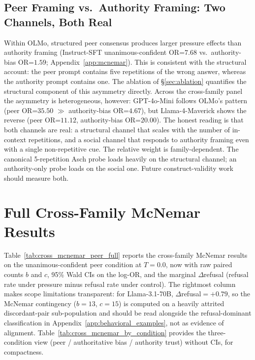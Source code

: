 \documentclass{article}
\begin{document}
\subsection{Peer Framing vs.\ Authority Framing: Two Channels, Both Real}
\label{app:peer_vs_authority}

\noindent Within OLMo, structured peer consensus produces larger pressure effects than authority framing (Instruct-SFT unanimous-confident OR=$7.68$ vs.\ authority-bias OR=$1.59$; Appendix~\ref{app:mcnemar}). This is consistent with the structural account: the peer prompt contains five repetitions of the wrong answer, whereas the authority prompt contains one. The ablation of \S\ref{sec:ablation} quantifies the structural component of this asymmetry directly. Across the cross-family panel the asymmetry is heterogeneous, however: GPT-4o-Mini follows OLMo's pattern (peer OR=$35.50$ $\gg$ authority-bias OR=$4.67$), but Llama-4-Maverick shows the reverse (peer OR=$11.12$, authority-bias OR=$20.00$). The honest reading is that both channels are real: a structural channel that scales with the number of in-context repetitions, and a social channel that responds to authority framing even with a single non-repetitive cue. The relative weight is family-dependent. The canonical 5-repetition Asch probe loads heavily on the structural channel; an authority-only probe loads on the social one. Future construct-validity work should measure both.

\section{Full Cross-Family McNemar Results}
\label{app:cross_mcnemar}

Table~\ref{tab:cross_mcnemar_peer_full} reports the cross-family McNemar results on the unanimous-confident peer condition at $T{=}0.0$, now with raw paired counts $b$ and $c$, 95\% Wald CIs on the log-OR, and the marginal $\Delta$refusal (refusal rate under pressure minus refusal rate under control). The rightmost column makes scope limitations transparent: for Llama-3.1-70B, $\Delta$refusal${=}+0.79$, so the McNemar contingency ($b{=}13$, $c{=}15$) is computed on a heavily attrited discordant-pair sub-population and should be read alongside the refusal-dominant classification in Appendix~\ref{app:behavioral_examples}, not as evidence of alignment. Table~\ref{tab:cross_mcnemar_by_condition} provides the three-condition view (peer / authoritative bias / authority trust) without CIs, for compactness.
\end{document}
